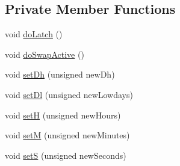 \subsection*{Private Member Functions}
\begin{DoxyCompactItemize}
\item 
void \hyperlink{classgambatte_1_1Rtc_af417d2ec560735dbd6a5f84a47aaec91}{do\+Latch} ()
\item 
void \hyperlink{classgambatte_1_1Rtc_a592f5fad483586ce3ecd1ae8bb4a0c87}{do\+Swap\+Active} ()
\item 
void \hyperlink{classgambatte_1_1Rtc_aadf610fa1853ec265998f35d6f45dd33}{set\+Dh} (unsigned new\+Dh)
\item 
void \hyperlink{classgambatte_1_1Rtc_a7de1f17bf962fa4fde5de485d97c98f1}{set\+Dl} (unsigned new\+Lowdays)
\item 
void \hyperlink{classgambatte_1_1Rtc_a5c25869bfe3b68d55fe17368b248689b}{setH} (unsigned new\+Hours)
\item 
void \hyperlink{classgambatte_1_1Rtc_a25b387d4b43ab3fd98d236d4e1e7ddd3}{setM} (unsigned new\+Minutes)
\item 
void \hyperlink{classgambatte_1_1Rtc_ab12534239b606a886e7eada91c107293}{setS} (unsigned new\+Seconds)
\end{DoxyCompactItemize}

